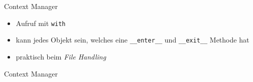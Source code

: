 \begin{frame}{Context Manager}
	\begin{itemize}
		\item Aufruf mit \alert{\texttt{with}}
		\item kann jedes Objekt sein, welches eine \texttt{\_\_enter\_\_} und \texttt{\_\_exit\_\_} Methode hat
		\item praktisch beim \textit{File Handling}
	\end{itemize}
\end{frame}

\begin{frame}{Context Manager}
	
\end{frame}




